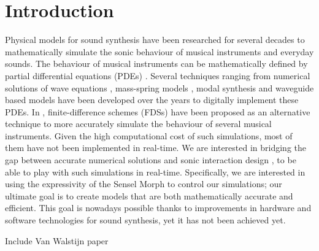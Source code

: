 \documentclass{article}
\title{\papertitle}
\begin{document}
%
\capstartfalse
\maketitle
\capstarttrue
%
\begin{abstract}
In this paper, we introduce several physical models of bowed and plucked string instruments that use accurate numerical simulations using finite-difference schemes (FDS), but are also efficient enough to run in real-time. We describe the mathematical formulation of these models together with a real-time implementation in JUCE, the control using the Sensel Morph.
\end{abstract}
%

\section{Introduction}\label{sec:introduction}

Physical models for sound synthesis have been researched for several decades to mathematically simulate the sonic behaviour of musical instruments and everyday sounds. The behaviour of musical instruments can be mathematically defined by partial differential equations (PDEs) \cite{Fletcher1998}. %
Several techniques ranging from numerical solutions of wave equations \cite{hiller1971synthesizing}, mass-spring models \cite{cadoz1993cordis}, modal synthesis \cite{morrison1993mosaic} and waveguide based models \cite{smith1992physical} have been developed over the years to digitally implement these PDEs.
In \cite{bilbao2009numerical}, finite-difference schemes (FDSs) have been proposed as an alternative technique to more accurately simulate the behaviour of several musical instruments.
Given the high computational cost of such simulations, most of them have not been implemented in real-time. 
We are interested in bridging the gap between accurate numerical solutions and sonic interaction design \cite{franinovic2013sonic}, to be able to play with such simulations in real-time. 
Specifically, we are interested in using the expressivity of the Sensel Morph \cite{sensel2018} to control our simulations; our ultimate goal is to create models that are both mathematically accurate and efficient. This goal is nowadays possible thanks to improvements in hardware and software technologies for sound synthesis, yet it has not been achieved yet.

Include Van Walstijn paper
\end{document}
